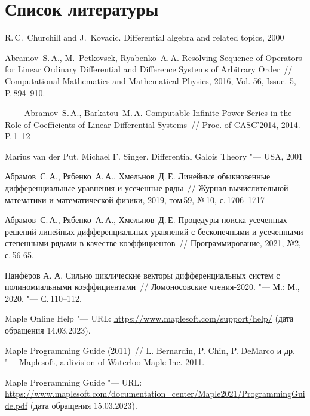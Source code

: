 \section{Список литературы}

\begingroup
\renewcommand{\section}[2]{}

\begin{thebibliography}{10}

        R.\,C.~Churchill and J.~Kovacic.
        Differential algebra and related topics, 2000
    
        Abramov~S.\,A., M.~Petkovsek, Ryabenko~A.\,A.
        Resolving Sequence of Operators for Linear Ordinary Differential and Difference Systems of Arbitrary Order~//
        Computational Mathematics and Mathematical Physics, 2016, Vol. 56, Issue. 5, P.\,894–910.
    
        Abramov~S.\,A., Barkatou~M.\,A.
        Computable Infinite Power Series in the Role of Coefficients of Linear Differential Systems~//
        Proc. of CASC’2014, 2014. P.\,1--12
    
        Marius van der Put, Michael F. Singer.
        Differential Galois Theory "--- USA, 2001

        Абрамов~С.\,А., Рябенко~А.\,А., Хмельнов~Д.\,Е.
        Линейные обыкновенные дифференциальные уравнения и усеченные ряды~//
        Журнал вычислительной математики и математической физики, 2019, том\,59, №\,10, с.\,1706--1717

        Абрамов~С.\,А., Рябенко~А.\,А., Хмельнов~Д.\,Е.
        Процедуры поиска усеченных решений линейных дифференциальных уравнений с бесконечными и усеченными степенными рядами в качестве коэффициентов~//
        Программирование, 2021, №2, с.\,56-65.

        Панфёров А. А.
        Сильно циклические векторы дифференциальных систем с полиномиальными коэффициентами~//
        Ломоносовские чтения-2020. "--- М.: М., 2020. "--- С.\,110--112.
    
        Maple Online Help "--- URL: \url{https://www.maplesoft.com/support/help/} (дата обращения 14.03.2023).

        Maple Programming Guide (2011)~//
        L. Bernardin, P. Chin, P. DeMarco и др. "---
        Maplesoft, a division of Waterloo Maple Inc. 2011.

        Maple Programming Guide "--- URL: \url{https://www.maplesoft.com/documentation_center/Maple2021/ProgrammingGuide.pdf} (дата обращения 15.03.2023).

\end{thebibliography}

\endgroup